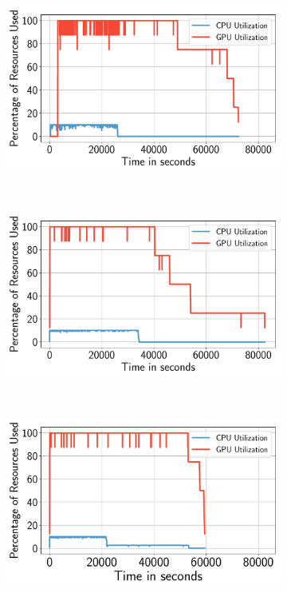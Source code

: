 \begin{figure}[ht!]
    \centering
    \begin{subfigure}[b]{0.33\textwidth}
        \includegraphics[width=\linewidth]{figures/designs/Design1Utilization.pdf}
        \caption{}
        \label{fig:design1util}
    \end{subfigure}%
    ~ 
    \begin{subfigure}[b]{0.33\textwidth}
        \includegraphics[width=\linewidth]{figures/designs/Design2Utilization.pdf}
        \caption{}
        \label{fig:design2util}
    \end{subfigure}%
    ~ 
    \begin{subfigure}[b]{0.33\textwidth}
        \includegraphics[width=\linewidth]{figures/designs/Design2AUtilization.pdf}

\end{subfigure}
\end{figure}
